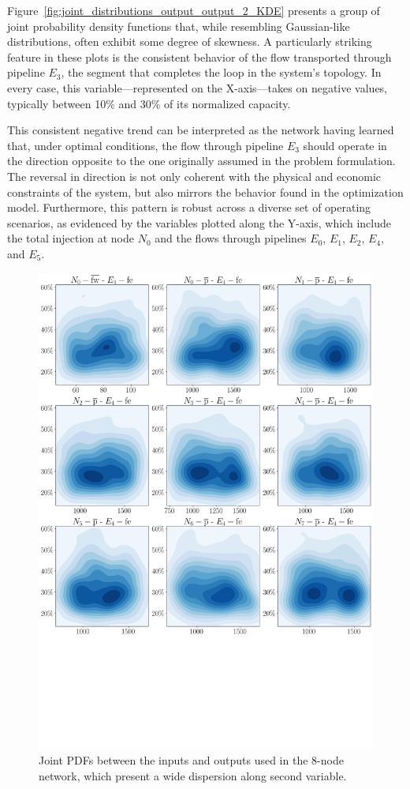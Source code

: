 Figure~\ref{fig:joint_distributions_output_output_2_KDE} presents a group of joint probability density functions that, while resembling Gaussian-like distributions, often exhibit some degree of skewness. A particularly striking feature in these plots is the consistent behavior of the flow transported through pipeline $E_3$, the segment that completes the loop in the system’s topology. In every case, this variable—represented on the X-axis—takes on negative values, typically between 10\% and 30\% of its normalized capacity.

This consistent negative trend can be interpreted as the network having learned that, under optimal conditions, the flow through pipeline $E_3$ should operate in the direction opposite to the one originally assumed in the problem formulation. The reversal in direction is not only coherent with the physical and economic constraints of the system, but also mirrors the behavior found in the optimization model. Furthermore, this pattern is robust across a diverse set of operating scenarios, as evidenced by the variables plotted along the Y-axis, which include the total injection at node $N_0$ and the flows through pipelines $E_0$, $E_1$, $E_2$, $E_4$, and $E_5$. 


\begin{figure}
    \begin{center}
        \includegraphics[width=.65\textwidth]{figures/Chapter_NonLinealCensnet/inputs_outputs_1 KDE.png}
    \end{center}
    \caption{Joint PDFs between the inputs and outputs used in the 8-node network, which present a wide dispersion along second variable. }
    \label{fig:joint_distributions_inputs_outputs_1_KDE}
\end{figure}

